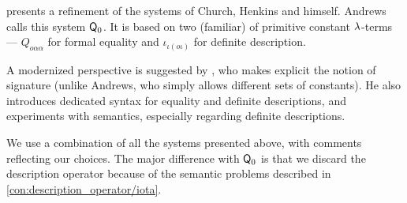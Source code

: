\begin{remark}
   presents a refinement of the systems of Church, Henkins and himself. Andrews calls this system \( \textsf{Q}_0 \). It is based on two (familiar) of primitive constant \( {\mathrm \lambda} \)-terms --- \( Q_{o \alpha \alpha} \) for formal equality and \( \iota_{\iota (o \iota)} \) for definite description.

  A modernized perspective is suggested by , who makes explicit the notion of signature (unlike Andrews, who simply allows different sets of constants). He also introduces dedicated syntax for equality and definite descriptions, and experiments with semantics, especially regarding definite descriptions.

  We use a combination of all the systems presented above, with comments reflecting our choices. The major difference with \( \textsf{Q}_0 \) is that we discard the description operator because of the semantic problems described in \cref{con:description_operator/iota}.
\end{remark}

